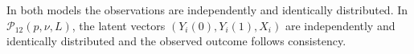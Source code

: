 In both models the observations are independently and identically distributed.  In \(\mathcal P_{12}(p,\nu,L)\), the latent vectors \((Y_i(0),Y_i(1),X_i)\) are independently and identically distributed and the observed outcome follows consistency.